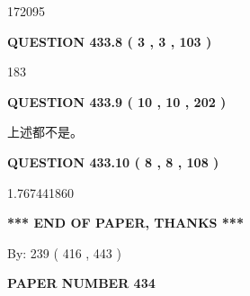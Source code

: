 \documentclass{ctexart}
\begin{document}
172095
 
 
  
\vspace{0.2in}
  
{\textbf{\Large{QUESTION
433.8 
 ( 3 , 3 , 103 )
}}}
  
  
 
 
\noindent{}

183
 
 
  
\vspace{0.2in}
  
{\textbf{\Large{QUESTION
433.9 
 ( 10 , 10 , 202 )
}}}
  
  
 
 
\noindent{}
 
 
 上述都不是。
 
 
 
 
  
\vspace{0.2in}
  
{\textbf{\Large{QUESTION
433.10 
 ( 8 , 8 , 108 )
}}}
  
  
 
 
\noindent{}

1.767441860
 
 
   
   
 \vspace{0.2in}
 
   
   
   
   
\vspace{1.0in} 
{\textbf{\large{ *** END OF PAPER, THANKS *** }}} 
   
   
\hspace{1.0in} By: 
 239 ( 416 ,  443 )
   
   
   
   
\newpage 
\setcounter{page}{ 
   434001 } 
   
   
   
   
 {\textbf{ \Large{ PAPER NUMBER  434  }}}
   
   
\vspace{0.2in}
   
   
   
\end{document}
